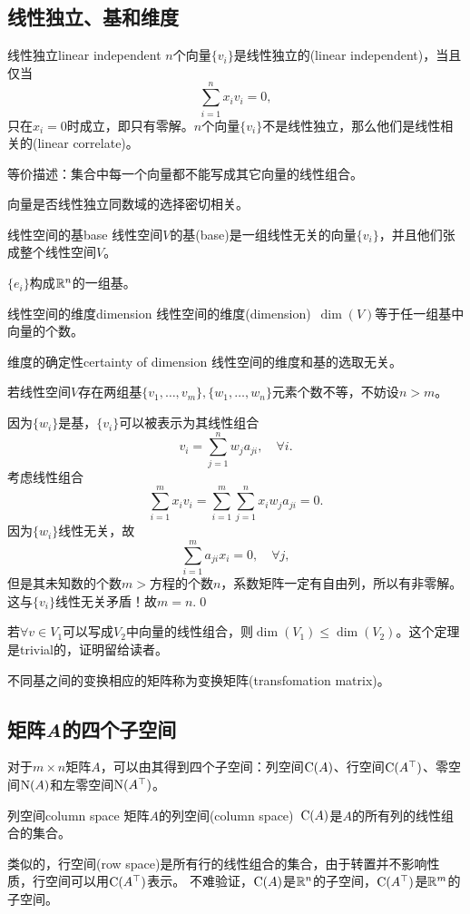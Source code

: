 \subsection{线性独立、基和维度}
\begin{definition}{线性独立}{linear independent}
	$n$个向量$\{v_i\}$是线性独立的(linear independent)，当且仅当
	\[
		\sum_{i=1}^nx_iv_i=0,
	\]
	只在$x_i=0$时成立，即只有零解。$n$个向量$\{v_i\}$不是线性独立，那么他们是线性相关的(linear correlate)。
	
	等价描述：集合中每一个向量都不能写成其它向量的线性组合。
\end{definition}
向量是否线性独立同数域的选择密切相关。
\begin{definition}{线性空间的基}{base}
	线性空间$V$的基(base)是一组线性无关的向量$\{v_i\}$，并且他们张成整个线性空间$V$。
\end{definition}
$\{e_i\}$构成$\mathbb R^n$的一组基。
\begin{definition}{线性空间的维度}{dimension}
	线性空间的维度(dimension)~$\dim(V)$等于任一组基中向量的个数。
\end{definition}
\begin{theorem}{维度的确定性}{certainty of dimension}
	线性空间的维度和基的选取无关。
\end{theorem}
\prf 若线性空间$V$存在两组基$\{v_1,\ldots,v_m\},\{w_1,\ldots,w_n\}$元素个数不等，不妨设$n>m$。

因为$\{w_i\}$是基，$\{v_i\}$可以被表示为其线性组合
\[
	v_i=\sum_{j=1}^nw_ja_{ji},\quad\forall i.
\]
考虑线性组合
\[
	\sum_{i=1}^mx_iv_i=\sum_{i=1}^m\sum_{j=1}^nx_iw_ja_{ji}=0.
\]
因为$\{w_i\}$线性无关，故
\[
	\sum_{i=1}^ma_{ji}x_i=0,\quad\forall j,
\]
但是其未知数的个数$m>$方程的个数$n$，系数矩阵一定有自由列，所以有非零解。这与$\{v_i\}$线性无关矛盾！故$m=n.$\qed

若$\forall v\in V_1$可以写成$V_2$中向量的线性组合，则$\dim(V_1)\leqslant\dim(V_2)$。这个定理是trivial的，证明留给读者。

不同基之间的变换相应的矩阵称为变换矩阵(transfomation matrix)。

\subsection{矩阵\textit{A}的四个子空间}
对于$m\times n$矩阵$A$，可以由其得到四个子空间：列空间$\operatorname{C}(A)$、行空间$\operatorname{C}(A^\top)$、零空间$\operatorname{N}(A)$和左零空间$\operatorname{N}(A^\top)$。
\begin{definition}{列空间}{column space}
	矩阵$A$的列空间(column space)~$\operatorname{C}(A)$是$A$的所有列的线性组合的集合。
\end{definition}
类似的，行空间(row space)是所有行的线性组合的集合，由于转置并不影响性质，行空间可以用$\operatorname{C}(A^\top)$表示。
不难验证，$\operatorname{C}(A)$是$\mathbb R^n$的子空间，$\operatorname{C}(A^\top)$是$\mathbb R^m$的子空间。

